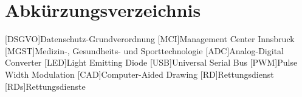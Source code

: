 \section*{Abkürzungsverzeichnis}
\begin{acronym}[DSGVO] %
	[DSGVO]{Datenschutz-Grundverordnung}
	[MCI]{Management Center Innsbruck}
	[MGST]{Medizin-, Gesundheits- und Sporttechnologie}
	[ADC]{Analog-Digital Converter}
	[LED]{Light Emitting Diode}
	[USB]{Universal Serial Bus}
	[PWM]{Pulse Width Modulation}
	[CAD]{Computer-Aided Drawing}
	[RD]{Rettungsdienst}
		[RDs]{Rettungsdienste} %
\end{acronym}